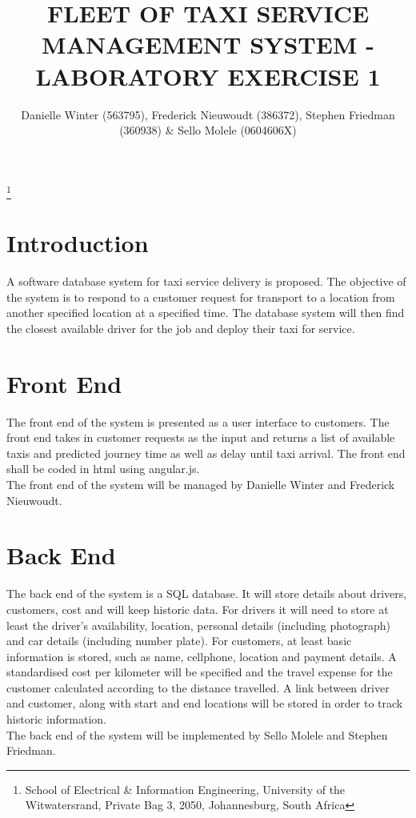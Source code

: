 \documentclass[10pt,twocolumn]{witseiepaper}
\begin{document}
\title{FLEET OF TAXI SERVICE MANAGEMENT SYSTEM - LABORATORY EXERCISE 1}

\author{Danielle Winter (563795), Frederick Nieuwoudt (386372), Stephen Friedman (360938) \& Sello Molele (0604606X)}
\thanks{School of Electrical \& Information Engineering, University of the
Witwatersrand, Private Bag 3, 2050, Johannesburg, South Africa}


%

\maketitle
\thispagestyle{empty}\pagestyle{empty}


%
\section{Introduction}
A software database system for taxi service delivery is proposed. The objective of the system is to respond to a customer request for transport to a location from another specified location at a specified time. The database system will then find the closest available driver for the job and deploy their taxi for service. 

\section{Front End}
The front end of the system is presented as a user interface to customers. The front end takes in customer requests as the input and returns a list of available taxis and predicted journey time as well as delay until taxi arrival. 
The front end shall be coded in html using angular.js.
\\
The front end of the system will be managed by Danielle Winter and Frederick Nieuwoudt.

\section{Back End}
The back end of the system is a SQL database. It will store details about drivers, customers, cost and will keep historic data. For drivers it will need to store at least the driver's availability, location, personal details (including photograph) and car details (including number plate). For customers, at least basic information is stored, such as name, cellphone, location and payment details. A standardised cost per kilometer will be specified and the travel expense for the customer calculated according to the distance travelled. A link between driver and customer, along with start and end locations will be stored in order to track historic information.
\\
The back end of the system will be implemented by Sello Molele and Stephen Friedman.
\end{document}
